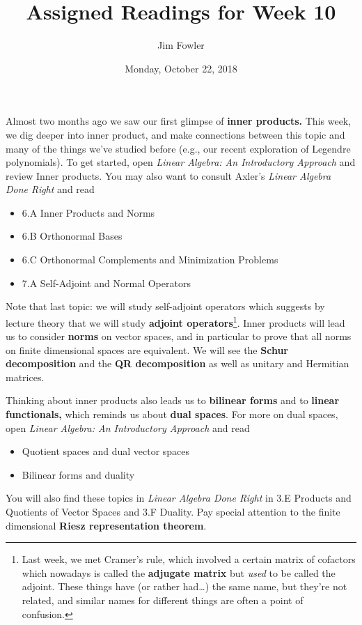 \documentclass{homework}
\author{Jim Fowler}
\title{Assigned Readings for Week 10}
\date{Monday, October 22, 2018}
\begin{document}
\maketitle

Almost two months ago we saw our first glimpse of \textbf{inner
  products.}  This week, we dig deeper into inner product, and make
connections between this topic and many of the things we've studied
before (e.g., our recent exploration of Legendre polynomials). To get started, open
\textit{Linear Algebra: An Introductory Approach} and review
 Inner products.  You may also want to consult Axler's
\textit{Linear Algebra Done Right} and read
\begin{itemize}
\item \textsection 6.A Inner Products and Norms
\item \textsection 6.B Orthonormal Bases
\item \textsection 6.C Orthonormal Complements and Minimization Problems
\item \textsection 7.A Self-Adjoint and Normal Operators
\end{itemize}
Note that last topic: we will study self-adjoint operators which
suggests by lecture theory that we will study \textbf{adjoint
  operators}\footnote{Last week, we met Cramer's rule, which involved a
certain matrix of cofactors which nowadays is called the
\textbf{adjugate matrix} but \textit{used} to be called the adjoint.
These things have (or rather had\ldots) the same name, but they're not
related, and similar names for different things are often a point of
confusion.}.  Inner products will lead us to consider \textbf{norms} on vector
spaces, and in particular to prove that all norms on finite
dimensional spaces are equivalent.  We will see the \textbf{Schur decomposition} and the \textbf{QR decomposition} as well as unitary and Hermitian matrices.

Thinking about inner products also leads us to \textbf{bilinear forms}
and to \textbf{linear functionals,} which  reminds us about
\textbf{dual spaces}.  For more on dual spaces, open \textit{Linear
  Algebra: An Introductory Approach} and read
\begin{itemize}
\item {} Quotient spaces and dual vector spaces
\item {} Bilinear forms and duality
\end{itemize}
You will also find these topics in \textit{Linear Algebra Done Right}
in \textsection 3.E Products and Quotients of Vector Spaces and
\textsection 3.F Duality.  Pay special attention to the finite dimensional \textbf{Riesz representation theorem}.
\end{document}
